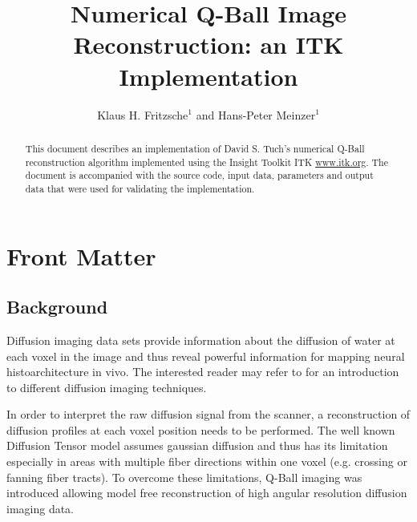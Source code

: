 \documentclass{InsightArticle}
\title{Numerical Q-Ball Image Reconstruction: an ITK Implementation}
\author{Klaus H. Fritzsche$^{1}$ and Hans-Peter Meinzer$^{1}$}
\newcommand{\IJhandlerIDnumber}{31}
\begin{document}
%
% 
\IJhandlefooter{\IJhandlerIDnumber}


\ifpdf
\else
\fi


\maketitle


\ifhtml
\chapter*{Front Matter\label{front}}
\fi


\begin{abstract}
\noindent
This document describes an implementation of David S. Tuch's numerical Q-Ball reconstruction
algorithm \cite{Tuch2004} implemented using the Insight Toolkit
ITK \url{www.itk.org}.  The document is accompanied with the source code, input data, parameters and output data that were used for validating the implementation. 

\end{abstract}

\IJhandlenote{\IJhandlerIDnumber}

\tableofcontents

\section{Background}

Diffusion imaging data sets provide information about the diffusion of water at each voxel in the image and thus reveal powerful information for mapping neural histoarchitecture in vivo. The interested reader may refer to \cite{Hagmann2006a} for an introduction to different diffusion imaging techniques.

In order to interpret the raw diffusion signal from the scanner, a reconstruction of diffusion profiles at each voxel position needs to be performed. The well known Diffusion Tensor model assumes gaussian diffusion and thus has its limitation especially in areas with multiple fiber directions within one voxel (e.g. crossing or fanning fiber tracts). To overcome these limitations, Q-Ball imaging was introduced allowing model free reconstruction of high angular resolution diffusion imaging data.
\end{document}

